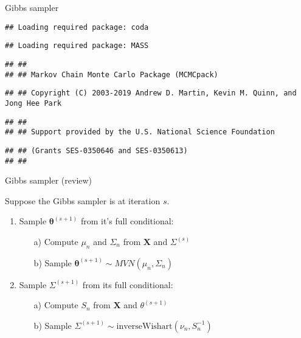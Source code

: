 \documentclass[ignorenonframetext,]{beamer}
\newcommand{\btheta}{{\bm\theta}}
\newcommand{\bX}   {\bm{X}}
\begin{document}
\begin{frame}[fragile]{Gibbs sampler}

\begin{verbatim}
## Loading required package: coda
\end{verbatim}

\begin{verbatim}
## Loading required package: MASS
\end{verbatim}

\begin{verbatim}
## ##
## ## Markov Chain Monte Carlo Package (MCMCpack)
\end{verbatim}

\begin{verbatim}
## ## Copyright (C) 2003-2019 Andrew D. Martin, Kevin M. Quinn, and Jong Hee Park
\end{verbatim}

\begin{verbatim}
## ##
## ## Support provided by the U.S. National Science Foundation
\end{verbatim}

\begin{verbatim}
## ## (Grants SES-0350646 and SES-0350613)
## ##
\end{verbatim}

\end{frame}

\begin{frame}{Gibbs sampler (review)}

Suppose the Gibbs sampler is at iteration \(s.\)

\begin{enumerate}
\item Sample $\btheta^{(s+1)}$ from it's full conditional:
\begin{enumerate}
\item[a)] Compute $\mu_n$ and $\Sigma_n$ from $\bX$ and $\Sigma^{(s)}$
\item[b)] Sample $\btheta^{(s+1)}\sim MVN(\mu_n, \Sigma_n)$
\end{enumerate}
\item Sample $\Sigma^{(s+1)}$ from its full conditional:
\begin{enumerate}
\item[a)] Compute $S_n$ from $\bX$ and $\theta^{(s+1)}$
\item[b)] Sample $\Sigma^{(s+1)} \sim \text{inverseWishart}(\nu_n, S_n^{-1})$
\end{enumerate}
\end{enumerate}

\end{frame}
\end{document}
